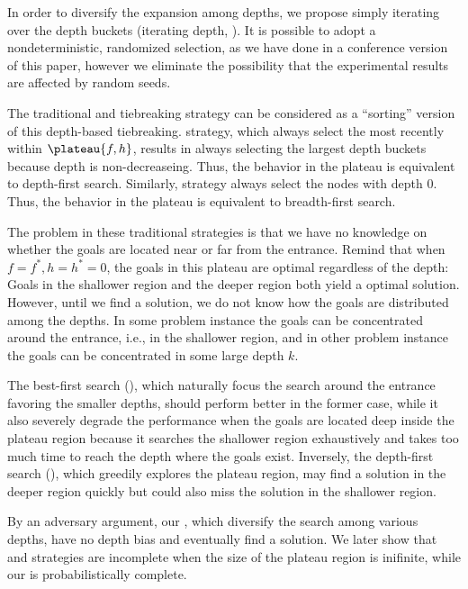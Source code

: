 In order to diversify the expansion among depths, we propose simply
iterating over the depth buckets (iterating depth, \id). It is possible to adopt a
nondeterministic, randomized selection, as we have done in a conference
version of this paper, however we eliminate the possibility that the
experimental results are affected by random seeds.

The traditional \lifo and \fifo tiebreaking strategy can be
considered as a ``sorting'' version of this depth-based tiebreaking.
\lifo strategy, which always select the most recently 
within $\plateau{f,h}$, results in always selecting the largest depth
buckets because depth is non-decreaseing. Thus, the behavior in the
plateau is equivalent to depth-first search. Similarly, \fifo strategy
always select the nodes with depth 0. Thus, the behavior in the plateau
is equivalent to breadth-first search.

The problem in these traditional strategies is that we have no knowledge
on whether the goals are located near or far from the entrance. Remind
that when $f=f^*, h=h^*=0$, the goals in this plateau are optimal
regardless of the depth: Goals in the shallower region and the deeper
region both yield a optimal solution. However, until we find a solution,
we do not know how the goals are distributed among the depths. In some
problem instance the goals can be concentrated around the entrance,
i.e., in the shallower region, and in other problem instance the goals
can be concentrated in some large depth $k$.

The best-first search (\fifo), which naturally focus the search around
the entrance favoring the smaller depths, should perform better in the
former case, while it also severely degrade the performance when the
goals are located deep inside the plateau region because it searches the
shallower region exhaustively and takes too much time to reach the depth
where the goals exist.
Inversely, the depth-first search (\lifo), which greedily explores the
plateau region, may find a solution in the deeper region quickly but
could also miss the solution in the shallower region.

By an adversary argument, our \id, which diversify the search among
various depths, have no depth bias and eventually find a solution.
We later show that \fifo and \lifo strategies are incomplete when the
size of the plateau region is inifinite, while our \id is
probabilistically complete.


